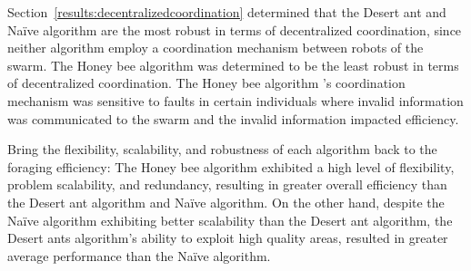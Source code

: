 Section~\ref{results:decentralizedcoordination} determined that the Desert ant and Na\"ive algorithm are the most robust in terms of decentralized coordination, since neither algorithm employ a coordination mechanism between robots of the swarm. The Honey bee algorithm was determined to be the least robust in terms of decentralized coordination. The Honey bee algorithm 's coordination mechanism was sensitive to faults in certain individuals where invalid information was communicated to the swarm and the invalid information impacted efficiency.

Bring the flexibility, scalability, and robustness of each algorithm back to the foraging efficiency: The Honey bee algorithm exhibited a high level of flexibility, problem scalability, and redundancy, resulting in greater overall efficiency than the Desert ant algorithm and Na\"ive algorithm. On the other hand, despite the Na\"ive algorithm exhibiting better scalability than the Desert ant algorithm, the Desert ants algorithm's ability to exploit high quality areas, resulted in greater average performance than the Na\"ive algorithm.

